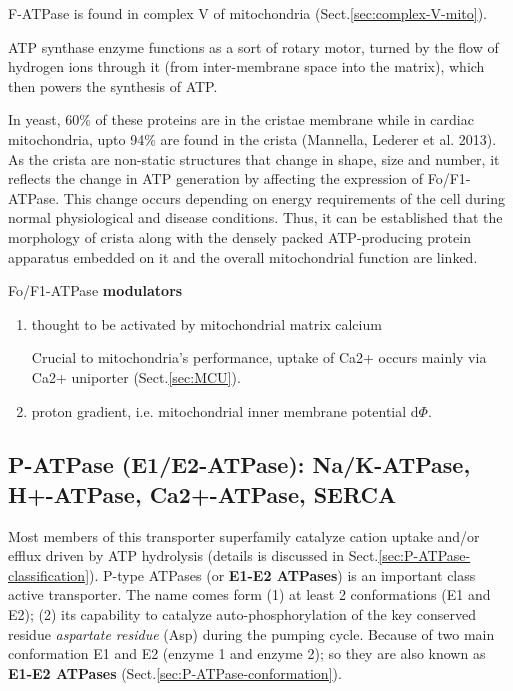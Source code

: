F-ATPase is found in complex V of mitochondria (Sect.\ref{sec:complex-V-mito}).

ATP synthase enzyme functions as a sort of rotary motor, turned by the flow of
hydrogen ions through it (from inter-membrane space into the matrix), which then
powers the synthesis of ATP.


In yeast, 60\% of these proteins are in the cristae membrane while in cardiac
mitochondria, upto 94\% are found in the crista (Mannella, Lederer et al. 2013).
As the crista are non-static structures that change in shape, size and number,
it reflects the change in ATP generation by affecting the expression of
Fo/F1-ATPase. This change occurs depending on energy requirements of the cell
during normal physiological and disease conditions.
Thus, it can be established that the morphology of crista along with the densely
packed ATP-producing protein apparatus embedded on it and the overall
mitochondrial function are linked. 

Fo/F1-ATPase {\bf modulators}
\begin{enumerate}
  \item thought to be activated by mitochondrial matrix calcium 
  
Crucial to mitochondria's performance, uptake of Ca2+ occurs mainly via Ca2+
uniporter (Sect.\ref{sec:MCU}).

  \item proton gradient, i.e. mitochondrial inner membrane potential d$\Phi$.
\end{enumerate}

\subsection{P-ATPase (E1/E2-ATPase): Na/K-ATPase, H+-ATPase, Ca2+-ATPase, SERCA}
\label{sec:P-ATPase}
\label{sec:P-type_ATPase}
\label{sec:E1/E2-ATPase}
\label{sec:P-ATPase}

Most members of this transporter superfamily catalyze cation uptake and/or
efflux driven by ATP hydrolysis (details is discussed in
Sect.\ref{sec:P-ATPase-classification}). P-type ATPases (or {\bf E1-E2 ATPases})
is an important class active transporter. The name comes form (1) at least 2
conformations (E1 and E2); (2) its capability to catalyze auto-phosphorylation
of the key conserved residue {\it aspartate residue} (Asp) during the pumping
cycle.
Because of two main conformation E1 and E2 (enzyme 1 and enzyme 2); so they are
also known as {\bf E1-E2 ATPases} (Sect.\ref{sec:P-ATPase-conformation}).


